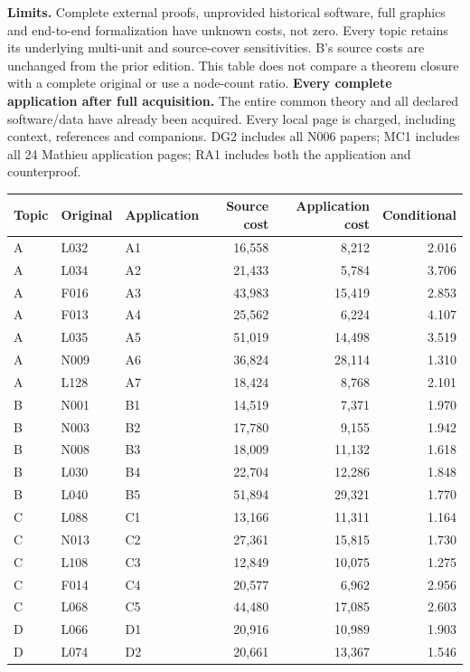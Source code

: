 \documentclass[11pt,a4paper]{article}
\newcommand{\tabsetup}{\small\setlength{\tabcolsep}{4pt}\renewcommand{\arraystretch}{1.10}}
\begin{document}
\textbf{Limits.} Complete external proofs, unprovided historical software, full graphics and end-to-end formalization have unknown costs, not zero. Every topic retains its underlying multi-unit and source-cover sensitivities. B's source costs are unchanged from the prior edition. This table does not compare a theorem closure with a complete original or use a node-count ratio.
\newpage
\textbf{Every complete application after full acquisition.}
The entire common theory and all declared software/data have already been acquired. Every local page is charged, including context, references and companions. DG2 includes all N006 papers; MC1 includes all 24 Mathieu application pages; RA1 includes both the application and counterproof.
\begin{center}\tabsetup\renewcommand{\arraystretch}{1.03}\begin{tabular}{lllrrr}\toprule
Topic & Original & Application & Source cost & Application cost & Conditional\\\midrule
A & L032 & A1 & 16,558 & 8,212 & 2.016 \\
A & L034 & A2 & 21,433 & 5,784 & 3.706 \\
A & F016 & A3 & 43,983 & 15,419 & 2.853 \\
A & F013 & A4 & 25,562 & 6,224 & 4.107 \\
A & L035 & A5 & 51,019 & 14,498 & 3.519 \\
A & N009 & A6 & 36,824 & 28,114 & 1.310 \\
A & L128 & A7 & 18,424 & 8,768 & 2.101 \\
B & N001 & B1 & 14,519 & 7,371 & 1.970 \\
B & N003 & B2 & 17,780 & 9,155 & 1.942 \\
B & N008 & B3 & 18,009 & 11,132 & 1.618 \\
B & L030 & B4 & 22,704 & 12,286 & 1.848 \\
B & L040 & B5 & 51,894 & 29,321 & 1.770 \\
C & L088 & C1 & 13,166 & 11,311 & 1.164 \\
C & N013 & C2 & 27,361 & 15,815 & 1.730 \\
C & L108 & C3 & 12,849 & 10,075 & 1.275 \\
C & F014 & C4 & 20,577 & 6,962 & 2.956 \\
C & L068 & C5 & 44,480 & 17,085 & 2.603 \\
D & L066 & D1 & 20,916 & 10,989 & 1.903 \\
D & L074 & D2 & 20,661 & 13,367 & 1.546 \\

\end{tabular}
\end{center}
\end{document}
